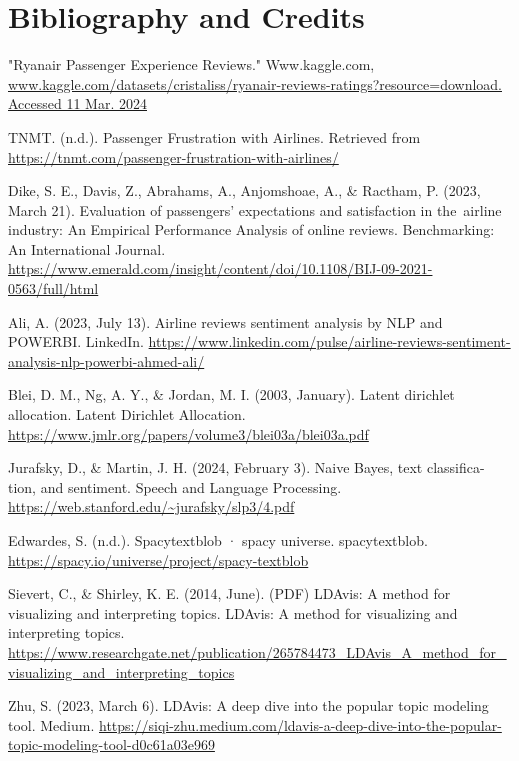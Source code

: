 \documentclass[11pt]{article} %
\begin{document}
\section{Bibliography and Credits}
\begin{thebibliography}{5}

    "Ryanair Passenger Experience Reviews." Www.kaggle.com, \url{www.kaggle.com/datasets/cristaliss/ryanair-reviews-ratings?resource=download. Accessed 11 Mar. 2024}
    
    TNMT. (n.d.). Passenger Frustration with Airlines. Retrieved from \url{https://tnmt.com/passenger-frustration-with-airlines/}
    
    Dike, S. E., Davis, Z., Abrahams, A., Anjomshoae, A., \& Ractham, P. (2023, March 21). Evaluation of passengers’ expectations and satisfaction in the airline industry: An Empirical Performance Analysis of online reviews. Benchmarking: An International Journal. \url{https://www.emerald.com/insight/content/doi/10.1108/BIJ-09-2021-0563/full/html} 
    
    
    Ali, A. (2023, July 13). Airline reviews sentiment analysis by NLP and POWERBI. LinkedIn. \url{https://www.linkedin.com/pulse/airline-reviews-sentiment-analysis-nlp-powerbi-ahmed-ali/} 

    Blei, D. M., Ng, A. Y., \& Jordan, M. I. (2003, January). Latent dirichlet allocation. Latent Dirichlet Allocation. \url{https://www.jmlr.org/papers/volume3/blei03a/blei03a.pdf} 

    Jurafsky, D., \& Martin, J. H. (2024, February 3). Naive Bayes, text classifica- tion, and sentiment. Speech and Language Processing. \url{https://web.stanford.edu/~jurafsky/slp3/4.pdf}

    Edwardes, S. (n.d.). Spacytextblob · spacy universe. spacytextblob. \url{https://spacy.io/universe/project/spacy-textblob} 

    Sievert, C., \& Shirley, K. E. (2014, June). (PDF) LDAvis: A method for visualizing and interpreting topics. LDAvis: A method for visualizing and interpreting topics. \url{https://www.researchgate.net/publication/265784473_LDAvis_A_method_for_visualizing_and_interpreting_topics} 


    Zhu, S. (2023, March 6). LDAvis: A deep dive into the popular topic modeling tool. Medium. \url{https://siqi-zhu.medium.com/ldavis-a-deep-dive-into-the-popular-topic-modeling-tool-d0c61a03e969} 


\end{thebibliography}
\end{document}
